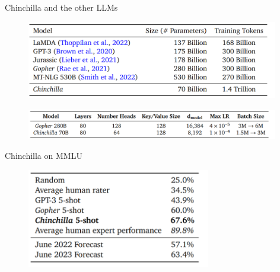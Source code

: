 
\begin{vbframe}{Chinchilla and the other LLM\MakeLowercase{s}}

\vfill

\begin{figure}
	\centering
	\includegraphics[width = 11cm]{./figure/llm_params.png} \\ 
\end{figure}

\begin{figure}
	\centering
	\includegraphics[width = 11cm]{./figure/chinchilla_gopher.png} \\ 
\end{figure}

\vfill

\end{vbframe}


\begin{vbframe}{Chinchilla on MMLU}

\vfill

\begin{figure}
	\centering
	\includegraphics[width = 8cm]{./figure/chinchilla_mmlu.png} \\ 
\end{figure}

\vfill

\end{vbframe}

